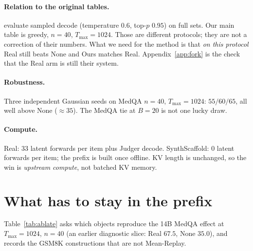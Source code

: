 \documentclass[11pt]{article}
\begin{document}
\paragraph{Relation to the original tables.}
\citet{zou2025latentmas} evaluate sampled decode (temperature $0.6$,
top-$p$ $0.95$) on full sets.
Our main table is greedy, $n{=}40$, $T_{\max}{=}1024$.
Those are different protocols; they are not a correction of their
numbers.
What we need for the method is that \emph{on this protocol} Real still
beats None and Ours matches Real.
Appendix~\ref{app:fork} is the check that the Real arm is still their
system.

\paragraph{Robustness.}
Three independent Gaussian seeds on MedQA $n{=}40$, $T_{\max}{=}1024$:
$55 / 60 / 65$, all well above None (${\approx}35$).
The MedQA tie at $B{=}20$ is not one lucky draw.

\paragraph{Compute.}
Real: $33$ latent forwards per item plus Judger decode.
SynthScaffold: $0$ latent forwards per item; the prefix is built once
offline.
KV length is unchanged, so the win is \emph{upstream compute}, not
batched KV memory.

\section{What has to stay in the prefix}
\label{sec:ablate}

Table~\ref{tab:ablate} asks which objects reproduce the 14B MedQA
effect at $T_{\max}{=}1024$, $n{=}40$ (an earlier diagnostic slice:
Real $67.5$, None $35.0$), and records the GSM8K constructions that
are not Mean-Replay.
\end{document}
